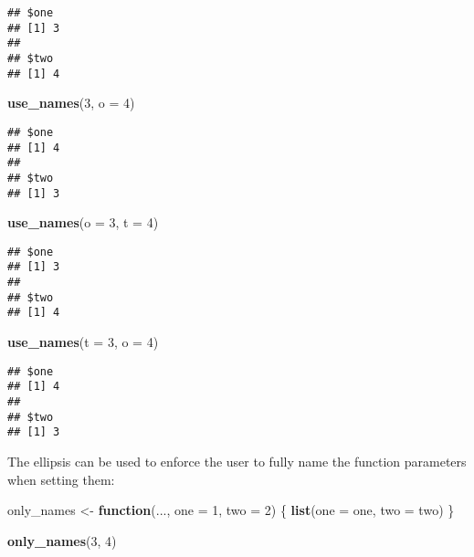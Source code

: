 \documentclass[]{book}
\newenvironment{Shaded}{\begin{snugshade}}{\end{snugshade}}
\newcommand{\ControlFlowTok}[1]{\textcolor[rgb]{0.13,0.29,0.53}{\textbf{#1}}}
\newcommand{\DataTypeTok}[1]{\textcolor[rgb]{0.13,0.29,0.53}{#1}}
\newcommand{\DecValTok}[1]{\textcolor[rgb]{0.00,0.00,0.81}{#1}}
\newcommand{\KeywordTok}[1]{\textcolor[rgb]{0.13,0.29,0.53}{\textbf{#1}}}
\newcommand{\NormalTok}[1]{#1}
\newcommand{\StringTok}[1]{\textcolor[rgb]{0.31,0.60,0.02}{#1}}
\begin{document}
\begin{verbatim}
## $one
## [1] 3
## 
## $two
## [1] 4
\end{verbatim}

\begin{Shaded}
\begin{Highlighting}[]
\KeywordTok{use_names}\NormalTok{(}\DecValTok{3}\NormalTok{, }\DataTypeTok{o =} \DecValTok{4}\NormalTok{)}
\end{Highlighting}
\end{Shaded}

\begin{verbatim}
## $one
## [1] 4
## 
## $two
## [1] 3
\end{verbatim}

\begin{Shaded}
\begin{Highlighting}[]
\KeywordTok{use_names}\NormalTok{(}\DataTypeTok{o =} \DecValTok{3}\NormalTok{, }\DataTypeTok{t =} \DecValTok{4}\NormalTok{)}
\end{Highlighting}
\end{Shaded}

\begin{verbatim}
## $one
## [1] 3
## 
## $two
## [1] 4
\end{verbatim}

\begin{Shaded}
\begin{Highlighting}[]
\KeywordTok{use_names}\NormalTok{(}\DataTypeTok{t =} \DecValTok{3}\NormalTok{, }\DataTypeTok{o =} \DecValTok{4}\NormalTok{)}
\end{Highlighting}
\end{Shaded}

\begin{verbatim}
## $one
## [1] 4
## 
## $two
## [1] 3
\end{verbatim}

The ellipsis can be used to enforce the user to fully name the function parameters when setting them:

\begin{Shaded}
\begin{Highlighting}[]
\NormalTok{only_names <-}\StringTok{ }\ControlFlowTok{function}\NormalTok{(..., }\DataTypeTok{one =} \DecValTok{1}\NormalTok{, }\DataTypeTok{two =} \DecValTok{2}\NormalTok{) \{}
  \KeywordTok{list}\NormalTok{(}\DataTypeTok{one =}\NormalTok{ one, }\DataTypeTok{two =}\NormalTok{ two)}
\NormalTok{\}}

\KeywordTok{only_names}\NormalTok{(}\DecValTok{3}\NormalTok{, }\DecValTok{4}\NormalTok{)}
\end{Highlighting}
\end{Shaded}
\end{document}

